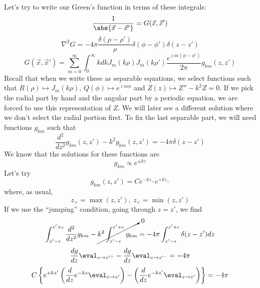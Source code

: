\documentclass[a4paper,twoside,master.tex]{subfiles}
\begin{document}
Let's try to write our Green's function in terms of these integrals:
\begin{equation}
    \frac{1}{\abs{\vec{x}-\vec{x}'}} = G(\vec{x},\vec{x}')
\end{equation}
\begin{equation}
    \nabla^2 G = -4\pi \frac{\delta(\rho-\rho')}{\rho}\delta(\phi-\phi')\delta(z-z')
\end{equation}
\begin{equation}
    G(\vec{x},\vec{x}') = \sum_{m=0}^{\infty} \int_{0}^{\infty}kdk J_m(k\rho)J_m(k\rho') \frac{e^{\imath m(\phi-\phi')}}{2\pi}g_{km}(z,z')
\end{equation}
Recall that when we write these as separable equations, we select functions such that $R(\rho)\mapsto J_m(k\rho)$, $Q(\phi)\mapsto e^{\imath m\phi}$ and $Z(z)\mapsto Z''-k^2Z = 0$. If we pick the radial part by hand and the angular part by a periodic equation, we are forced to use this representation of $Z$. We will later see a different solution where we don't select the radial portion first. To fix the last separable part, we will need functions $g_{km}$ such that
\begin{equation}
    \frac{d^2}{dz^2}g_{km}(z,z') - k^2 g_{km}(z,z') = -4\pi\delta(z-z')
\end{equation}
We know that the solutions for these functions are
\begin{equation}
    g_{km} \propto e^{\pm kz}
\end{equation}
Let's try
\begin{equation}
    g_{km}(z,z') = C e^{-kz_>} e^{+kz_<}
\end{equation}
where, as usual,
\begin{equation}
    z_> = \max(z,z'),\ z_< = \min(z,z')
\end{equation}
If we use the ``jumping'' condition, going through $z=z'$, we find
\begin{equation}
    \int_{z'-\epsilon}^{z'+\epsilon}\frac{d^2}{dz^2}g_{km} - \cancelto{0}{k^2\int_{z'-\epsilon}^{z'+\epsilon} g_{km}} = -4\pi\int_{z'-\epsilon}^{z'+\epsilon} \delta(z-z')dz
\end{equation}
\begin{equation}
    \frac{dg}{dz}\eval_{z\to z'^+} - \frac{dg}{dz}\eval_{z\to z'^-} = -4\pi
\end{equation}
\begin{equation}
    C \left\{ e^{+kz'}\left( \frac{d}{dz}e^{-kz}\eval_{z\to z'} \right) - \left( \frac{d}{dz}e^{-kz'}\eval_{z\to z'} \right)   \right\} = -4\pi
\end{equation}
\end{document}
